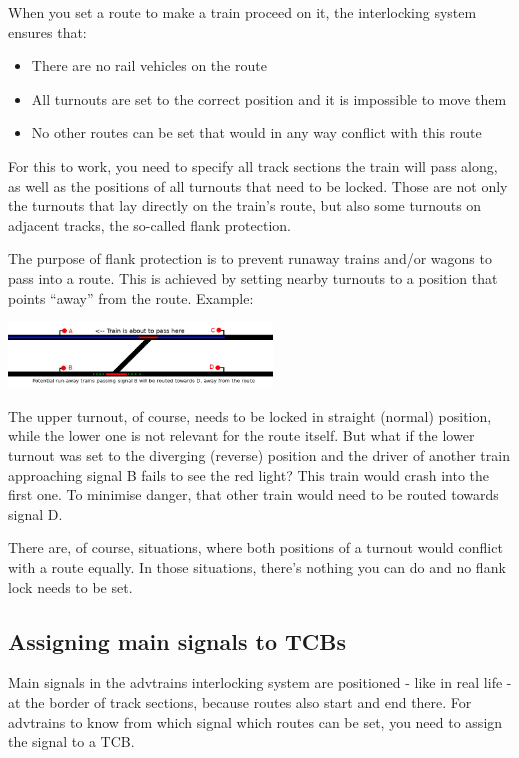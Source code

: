 \documentclass[english]{paper}
\begin{document}
When you set a route to make a train proceed on it, the interlocking
system ensures that:
\begin{itemize}
\item There are no rail vehicles on the route
\item All turnouts are set to the correct position and it is impossible
to move them
\item No other routes can be set that would in any way conflict with this
route
\end{itemize}
For this to work, you need to specify all track sections the train
will pass along, as well as the positions of all turnouts that need
to be locked. Those are not only the turnouts that lay directly on
the train's route, but also some turnouts on adjacent tracks, the
so-called flank protection.

The purpose of flank protection is to prevent runaway trains and/or
wagons to pass into a route. This is achieved by setting nearby turnouts
to a position that points ``away'' from the route. Example:

\includegraphics[width=7cm]{7_home_moritz_Home_Projekte_Minetest_minetest_mods_advtrains_assets_lyx_img_route_ex2.png}

The upper turnout, of course, needs to be locked in straight (normal)
position, while the lower one is not relevant for the route itself.
But what if the lower turnout was set to the diverging (reverse) position
and the driver of another train approaching signal B fails to see
the red light? This train would crash into the first one. To minimise
danger, that other train would need to be routed towards signal D.

There are, of course, situations, where both positions of a turnout
would conflict with a route equally. In those situations, there's
nothing you can do and no flank lock needs to be set.

\subsection{Assigning main signals to TCBs}

Main signals in the advtrains interlocking system are positioned -
like in real life - at the border of track sections, because routes
also start and end there. For advtrains to know from which signal
which routes can be set, you need to assign the signal to a TCB.
\end{document}
